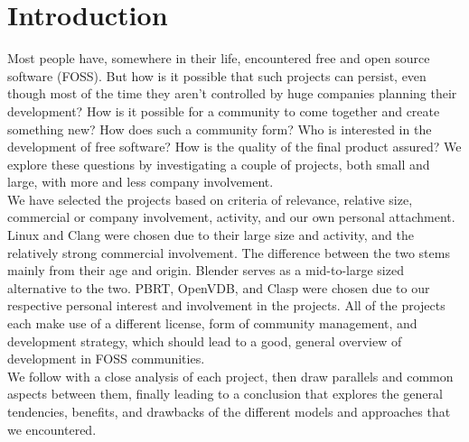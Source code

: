 \section{Introduction}
Most people have, somewhere in their life, encountered free and open source software (FOSS). But how is it possible that such projects can persist, even though most of the time they aren't controlled by huge companies planning their development? How is it possible for a community to come together and create something new? How does such a community form? Who is interested in the development of free software? How is the quality of the final product assured? We explore these questions by investigating a couple of projects, both small and large, with more and less company involvement. \\

We have selected the projects based on criteria of relevance, relative size, commercial or company involvement, activity, and our own personal attachment. Linux and Clang were chosen due to their large size and activity, and the relatively strong commercial involvement. The difference between the two stems mainly from their age and origin. Blender serves as a mid-to-large sized alternative to the two. PBRT, OpenVDB, and Clasp were chosen due to our respective personal interest and involvement in the projects. All of the projects each make use of a different license, form of community management, and development strategy, which should lead to a good, general overview of development in FOSS communities. \\

We follow with a close analysis of each project, then draw parallels and common aspects between them, finally leading to a conclusion that explores the general tendencies, benefits, and drawbacks of the different models and approaches that we encountered.

